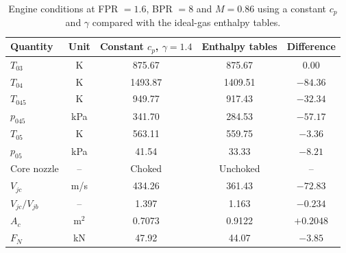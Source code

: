 \begin{table}[H]
\centering
\begin{tabular}{l c c c c}
\toprule
Quantity & Unit & Constant $c_p$, $\gamma = 1.4$ & Enthalpy tables & Difference \\
\midrule
$T_{03}$              & K       & 875.67  & 875.67   & $0.00$    \\
$T_{04}$              & K       & 1493.87 & 1409.51  & $-84.36$  \\
$T_{045}$             & K       & 949.77  & 917.43   & $-32.34$  \\
$p_{045}$             & kPa     & 341.70  & 284.53   & $-57.17$  \\
$T_{05}$              & K       & 563.11  & 559.75   & $-3.36$   \\
$p_{05}$              & kPa     & 41.54   & 33.33    & $-8.21$   \\
Core nozzle           & --      & Choked  & Unchoked & --        \\
$V_{jc}$              & m/s     & 434.26  & 361.43   & $-72.83$  \\
$V_{jc}/V_{jb}$       & --      & 1.397   & 1.163    & $-0.234$  \\
$A_c$                 & m$^2$   & 0.7073  & 0.9122   & $+0.2048$ \\
$F_N$                 & kN      & 47.92   & 44.07    & $-3.85$   \\
\bottomrule
\end{tabular}
\caption{Engine conditions at FPR $= 1.6$, BPR $= 8$ and $M = 0.86$ using a constant
$c_p$ and $\gamma$ compared with the ideal-gas enthalpy tables.}
\label{tab:cp_comparison}
\end{table}
